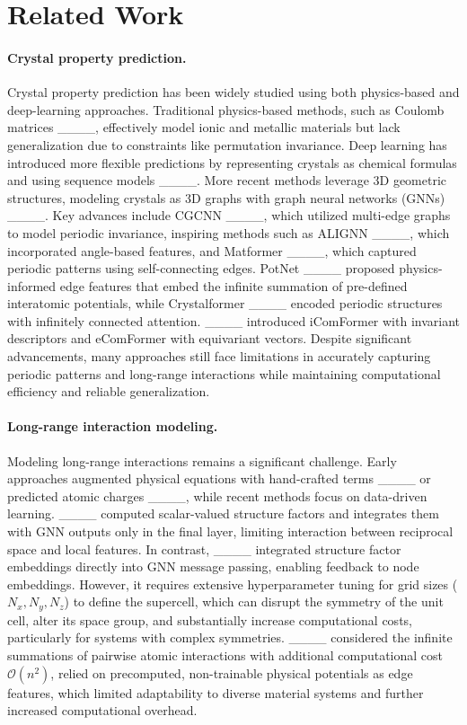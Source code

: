 \section{Related Work}
\paragraph{Crystal property prediction.} 
Crystal property prediction has been widely studied using both physics-based and deep-learning approaches. Traditional physics-based methods, such as Coulomb matrices ____, effectively model ionic and metallic materials but lack generalization due to constraints like permutation invariance. Deep learning has introduced more flexible predictions by representing crystals as chemical formulas and using sequence models ____. More recent methods leverage 3D geometric structures, modeling crystals as 3D graphs with graph neural networks (GNNs) ____. Key advances include CGCNN ____, which utilized multi-edge graphs to model periodic invariance, inspiring methods such as ALIGNN ____, which incorporated angle-based features, and Matformer ____, which captured periodic patterns using self-connecting edges. PotNet ____ proposed physics-informed edge features that embed the infinite summation of pre-defined interatomic potentials, while Crystalformer ____ encoded periodic structures with infinitely connected attention. ____ introduced iComFormer with invariant descriptors and eComFormer with equivariant vectors. Despite significant advancements, many approaches still face limitations in accurately capturing periodic patterns and long-range interactions while maintaining computational efficiency and reliable generalization.


\paragraph{Long-range interaction modeling.}
Modeling long-range interactions remains a significant challenge. Early approaches augmented physical equations with hand-crafted terms ____ or predicted atomic charges ____, while recent methods focus on data-driven learning. 
____ computed scalar-valued structure factors and integrates them with GNN outputs only in the final layer, limiting interaction between reciprocal space and local features. In contrast, ____ integrated structure factor embeddings directly into GNN message passing, enabling feedback to node embeddings. However, it requires extensive hyperparameter tuning for grid sizes ($N_x, N_y, N_z$) to define the supercell, which can disrupt the symmetry of the unit cell, alter its space group, and substantially increase computational costs, particularly for systems with complex symmetries.
____ considered the infinite summations of pairwise atomic interactions with additional computational cost $\mathcal{O}(n^2)$, relied on precomputed, non-trainable physical potentials as edge features, which limited adaptability to diverse material systems and further increased computational overhead.


